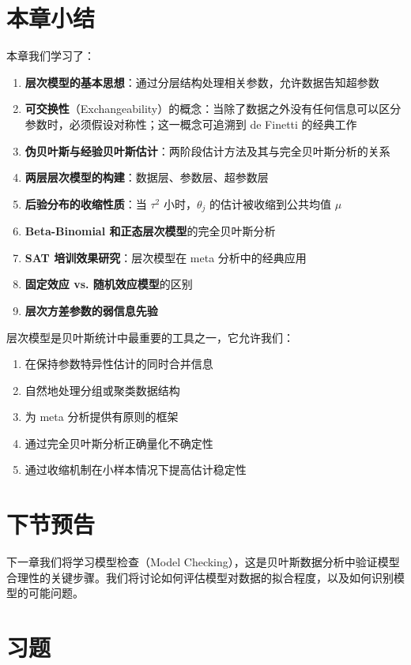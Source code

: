 \section{本章小结}

本章我们学习了：

\begin{enumerate}
  \item \textbf{层次模型的基本思想}：通过分层结构处理相关参数，允许数据告知超参数
  \item \textbf{可交换性}（Exchangeability）的概念：当除了数据之外没有任何信息可以区分参数时，必须假设对称性；这一概念可追溯到 de Finetti 的经典工作
  \item \textbf{伪贝叶斯与经验贝叶斯估计}：两阶段估计方法及其与完全贝叶斯分析的关系
  \item \textbf{两层层次模型的构建}：数据层、参数层、超参数层
  \item \textbf{后验分布的收缩性质}：当 $\tau^2$ 小时，$\theta_j$ 的估计被收缩到公共均值 $\mu$
  \item \textbf{Beta-Binomial 和正态层次模型}的完全贝叶斯分析
  \item \textbf{SAT 培训效果研究}：层次模型在 meta 分析中的经典应用
  \item \textbf{固定效应 vs. 随机效应模型}的区别
  \item \textbf{层次方差参数的弱信息先验}
\end{enumerate}

层次模型是贝叶斯统计中最重要的工具之一，它允许我们：

\begin{enumerate}
  \item 在保持参数特异性估计的同时合并信息
  \item 自然地处理分组或聚类数据结构
  \item 为 meta 分析提供有原则的框架
  \item 通过完全贝叶斯分析正确量化不确定性
  \item 通过收缩机制在小样本情况下提高估计稳定性
\end{enumerate}

\section{下节预告}

下一章我们将学习模型检查（Model Checking），这是贝叶斯数据分析中验证模型合理性的关键步骤。我们将讨论如何评估模型对数据的拟合程度，以及如何识别模型的可能问题。

\section{习题}\label{sec:chapter5-exercises}

